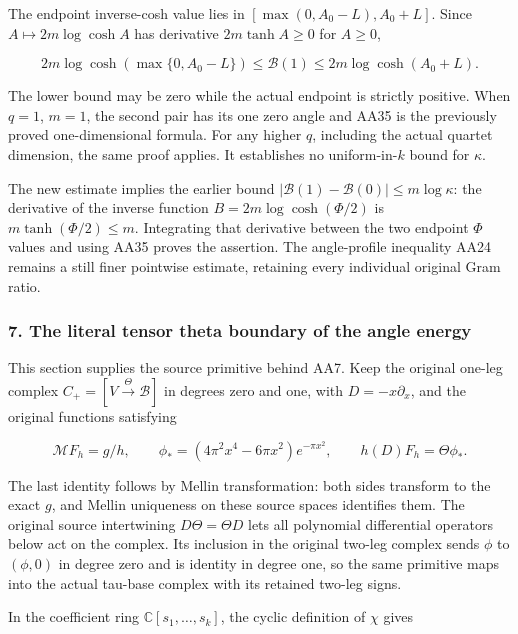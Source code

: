 The endpoint inverse-cosh value lies in \([\max(0,A_0-L),A_0+L]\). Since \(A\mapsto2m\log\cosh A\) has derivative \(2m\tanh A\ge0\) for \(A\ge0\),

\[
\boxed{
2m\log\cosh(\max\{0,A_0-L\})
\le\mathcal B(1)\le2m\log\cosh(A_0+L).
}
\tag{AA37}
\]

The lower bound may be zero while the actual endpoint is strictly positive. When \(q=1\), \(m=1\), the second pair has its one zero angle and AA35 is the previously proved one-dimensional formula. For any higher \(q\), including the actual quartet dimension, the same proof applies. It establishes no uniform-in-\(k\) bound for \(\kappa\).

The new estimate implies the earlier bound \(|\mathcal B(1)-\mathcal B(0)|\le m\log\kappa\): the derivative of the inverse function \(B=2m\log\cosh(\Phi/2)\) is \(m\tanh(\Phi/2)\le m\). Integrating that derivative between the two endpoint \(\Phi\) values and using AA35 proves the assertion. The angle-profile inequality AA24 remains a still finer pointwise estimate, retaining every individual original Gram ratio.

\subsubsection{7. The literal tensor theta boundary of the angle energy}\label{endpoint-all_degree_angle_review--the-literal-tensor-theta-boundary-of-the-angle-energy}

This section supplies the source primitive behind AA7. Keep the original one-leg complex \(C_+=[V\xrightarrow{\Theta}\mathscr B]\) in degrees zero and one, with \(D=-x\partial_x\), and the original functions satisfying

\[
\mathcal MF_h=g/h,\qquad
\phi_*=(4\pi^2x^4-6\pi x^2)e^{-\pi x^2},\qquad
h(D)F_h=\Theta\phi_*.
\tag{AA38}
\]

The last identity follows by Mellin transformation: both sides transform to the exact \(g\), and Mellin uniqueness on these source spaces identifies them. The original source intertwining \(D\Theta=\Theta D\) lets all polynomial differential operators below act on the complex. Its inclusion in the original two-leg complex sends \(\phi\) to \((\phi,0)\) in degree zero and is identity in degree one, so the same primitive maps into the actual tau-base complex with its retained two-leg signs.

In the coefficient ring \(\mathbb C[s_1,\ldots,s_k]\), the cyclic definition of \(\chi\) gives

